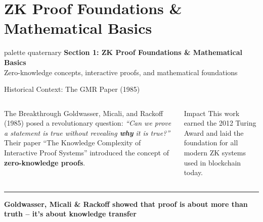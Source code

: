 \documentclass[8pt,aspectratio=169]{beamer}
\newcommand{\bottomnote}[1]{\vfill\vspace{-2mm}\textcolor{mllavender2}{\rule{\textwidth}{0.4pt}}\vspace{1mm}\footnotesize\textbf{#1}}
\begin{document}
\section{ZK Proof Foundations \& Mathematical Basics}

\begin{frame}{}
\begin{beamercolorbox}[sep=12pt,center,rounded=true,shadow=true]{palette quaternary}
{\Large\bfseries Section 1: ZK Proof Foundations \& Mathematical Basics}\\[6pt]
{\normalsize Zero-knowledge concepts, interactive proofs, and mathematical foundations}
\end{beamercolorbox}
\end{frame}

\begin{frame}{Historical Context: The GMR Paper (1985)}
\begin{columns}[T]
\begin{block}{The Breakthrough}
\footnotesize
Goldwasser, Micali, and Rackoff (1985) posed a revolutionary question:
\vspace{2mm}
\textit{``Can we prove a statement is true without revealing \textbf{why} it is true?''}
\vspace{2mm}
Their paper ``The Knowledge Complexity of Interactive Proof Systems'' introduced the concept of \textbf{zero-knowledge proofs}.
\end{block}
\vspace{2mm}
\begin{exampleblock}{\footnotesize Impact}
\footnotesize
This work earned the 2012 Turing Award and laid the foundation for all modern ZK systems used in blockchain today.
\end{exampleblock}

\end{columns}
\bottomnote{Goldwasser, Micali \& Rackoff showed that proof is about more than truth -- it's about knowledge transfer}
\end{frame}
\end{document}
